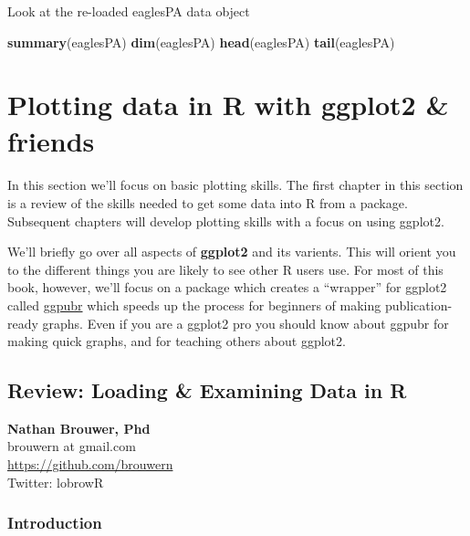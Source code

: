 \documentclass[]{book}
\newenvironment{Shaded}{\begin{snugshade}}{\end{snugshade}}
\newcommand{\KeywordTok}[1]{\textcolor[rgb]{0.13,0.29,0.53}{\textbf{#1}}}
\newcommand{\NormalTok}[1]{#1}
\theoremstyle{definition}
\theoremstyle{definition}
\theoremstyle{definition}
\theoremstyle{remark}
\begin{document}
Look at the re-loaded eaglesPA data object

\begin{Shaded}
\begin{Highlighting}[]
\KeywordTok{summary}\NormalTok{(eaglesPA)}
\KeywordTok{dim}\NormalTok{(eaglesPA)}
\KeywordTok{head}\NormalTok{(eaglesPA)}
\KeywordTok{tail}\NormalTok{(eaglesPA)}
\end{Highlighting}
\end{Shaded}

\part{Plotting data in R with ggplot2 \&
friends}\label{part-plotting-data-in-r-with-ggplot2-friends}

\subsection*{}\label{section-2}

In this section we'll focus on basic plotting skills. The first chapter
in this section is a review of the skills needed to get some data into R
from a package. Subsequent chapters will develop plotting skills with a
focus on using ggplot2.

We'll briefly go over all aspects of \textbf{ggplot2} and its varients.
This will orient you to the different things you are likely to see other
R users use. For most of this book, however, we'll focus on a package
which creates a ``wrapper'' for ggplot2 called
\href{http://www.sthda.com/english/rpkgs/ggpubr/}{ggpubr} which speeds
up the process for beginners of making publication-ready graphs. Even if
you are a ggplot2 pro you should know about ggpubr for making quick
graphs, and for teaching others about ggplot2.

\chapter{Review: Loading \& Examining Data in
R}\label{review-loading-examining-data-in-r}

\textbf{Nathan Brouwer, Phd}\\
brouwern at gmail.com\\
\url{https://github.com/brouwern}\\
Twitter: lobrowR

\section{Introduction}\label{introduction-5}
\end{document}

